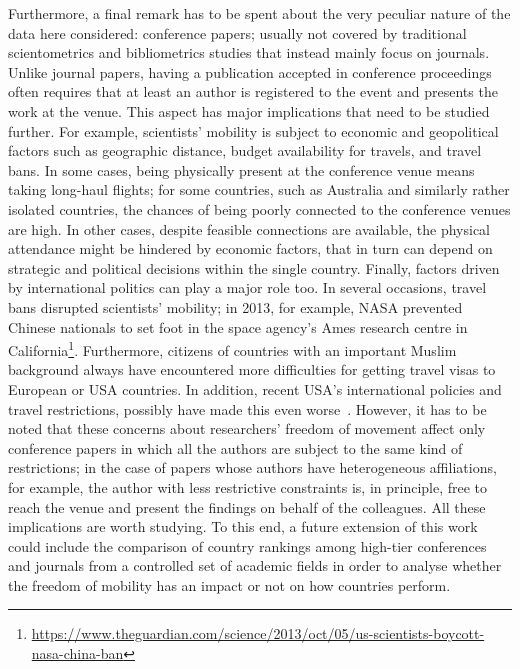 \documentclass{llncs}
\begin{document}
Furthermore, a final remark has to be spent about the very peculiar nature of the data here considered: conference papers; usually not covered by traditional scientometrics and bibliometrics studies that instead mainly focus on journals.
Unlike journal papers, having a publication accepted in conference proceedings often requires that at least an author is registered to the event and presents the work at the venue.
This aspect has major implications that need to be studied further.
For example, scientists' mobility is subject to economic and geopolitical factors such as geographic distance, budget availability for travels, and travel bans.
In some cases, being physically present at the conference venue means taking long-haul flights; for some countries, such as Australia and similarly rather isolated countries, the chances of being poorly connected to the conference venues are high.
In other cases, despite feasible connections are available, the physical attendance might be hindered by economic factors, that in turn can depend on strategic and political decisions within the single country.
Finally, factors driven by international politics can play a major role too.
In several occasions, travel bans disrupted scientists' mobility; in 2013, for example, NASA prevented Chinese nationals to set foot in the space agency's Ames research centre in California\footnote{\url{https://www.theguardian.com/science/2013/oct/05/us-scientists-boycott-nasa-china-ban}}.
Furthermore, citizens of countries with an important Muslim background always have encountered more difficulties for getting travel visas to European or USA countries. 
In addition, recent USA's international policies and travel restrictions, possibly have made this even worse~\cite{morello2017scientists}.
However, it has to be noted that these concerns about researchers' freedom of movement affect only conference papers in which all the authors are subject to the same kind of restrictions; in the case of papers whose authors have heterogeneous affiliations, for example, the author with less restrictive constraints is, in principle, free to reach the venue and present the findings on behalf of the colleagues.
All these implications are worth studying.
To this end, a future extension of this work could include the comparison of country rankings among high-tier conferences and journals from a controlled set of academic fields in order to analyse whether the freedom of mobility has an impact or not on how countries perform.
\end{document}
